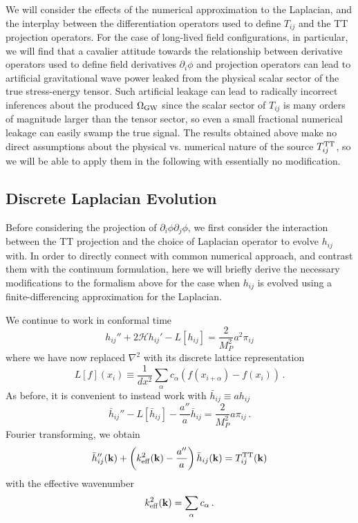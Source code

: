 \documentclass{revtex4}
\begin{document}
We will consider the effects of the numerical approximation to the Laplacian, and the interplay between the differentiation operators used to define $T_{ij}$ and the TT projection operators.
For the case of long-lived field configurations, in particular, we will find that a cavalier attitude towards the relationship between derivative operators used to define field derivatives $\partial_i\phi$ and projection operators can lead to artificial gravitational wave power leaked from the physical scalar sector of the true stress-energy tensor.
Such artificial leakage can lead to radically incorrect inferences about the produced $\Omega_{\rm GW}$ since the scalar sector of $T_{ij}$ is many orders of magnitude larger than the tensor sector, so even a small fractional numerical leakage can easily swamp the true signal.
The results obtained above make no direct assumptions about the physical vs. numerical nature of the source $T_{ij}^{{\rm TT}}$, so we will be able to apply them in the following with essentially no modification.

\subsection{Discrete Laplacian Evolution}
Before considering the projection of $\partial_i\phi\partial_j\phi$, we first consider the interaction between the TT projection and the choice of Laplacian operator to evolve $h_{ij}$ with.
In order to directly connect with common numerical approach, and contrast them with the continuum formulation, here we will briefly derive the necessary modifications to the formalism above for the case when $h_{ij}$ is evolved using a finite-differencing approximation for the Laplacian.

We continue to work in conformal time
\begin{equation}
  h_{ij}'' + 2\mathcal{H}h_{ij}' - L[h_{ij}] = \frac{2}{M_P^2}a^2\pi_{ij}
\end{equation}
where we have now replaced $\nabla^2$ with its discrete lattice representation
\begin{equation}
  L[f](x_i) \equiv \frac{1}{dx^2}\sum_\alpha c_{\alpha}\left(f(x_{i+\alpha})-f(x_i)\right) \, .
\end{equation}
As before, it is convenient to instead work with $\bar{h}_{ij} \equiv ah_{ij}$
\begin{equation}
  \bar{h}_{ij}'' - L[\bar{h}_{ij}] - \frac{a''}{a}\bar{h}_{ij} = \frac{2}{M_P^2}a\pi_{ij} \, .
\end{equation}
Fourier transforming, we obtain
\begin{equation}
  \bar{h}_{ij}''({\bf k}) + \left(k_{\rm eff}^2({\bf k}) -\frac{a''}{a}\right) \bar{h}_{ij}({\bf k}) = T_{ij}^{{\rm TT}}({\bf k}) 
\end{equation}
with the effective wavenumber
\begin{equation}
  k_{\rm eff}^2({\bf k}) = \sum_\alpha c_\alpha \, .
\end{equation}
\end{document}
